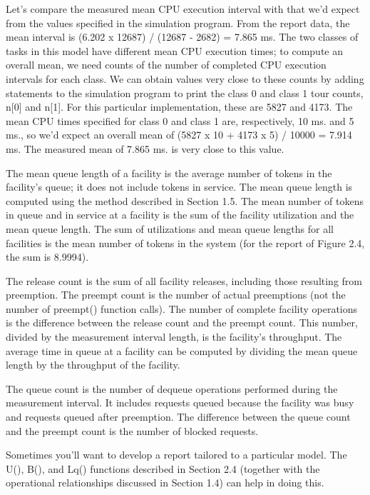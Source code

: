 Let's compare the measured mean CPU execution interval with that we'd expect
from the values specified in the simulation program. From the report data, the
mean interval is (6.202 x 12687) / (12687 - 2682) = 7.865 ms. The two classes
of tasks in this model have different mean CPU execution times; to compute an
overall mean, we need counts of the number of completed CPU execution
intervals for each class. We can obtain values very close to these counts by
adding statements to the simulation program to print the class 0 and class 1
tour counts, n[0] and n[1]. For this particular implementation, these are 5827
and 4173. The mean CPU times specified for class 0 and class 1 are,
respectively, 10 ms. and 5 ms., so we'd expect an overall mean of
(5827 x 10 + 4173 x 5) / 10000 = 7.914 ms. The measured mean of 7.865 ms. is
very close to this value.

The mean queue length of a facility is the average number of tokens in the
facility's queue; it does not include tokens in service. The mean queue length
is computed using the method described in Section 1.5. The mean number of
tokens in queue and in service at a facility is the sum of the facility
utilization and the mean queue length. The sum of utilizations and mean queue
lengths for all facilities is the mean number of tokens in the system (for the
report of Figure 2.4, the sum is 8.9994).

The release count is the sum of all facility releases, including those
resulting from preemption. The preempt count is the number of actual
preemptions (not the number of preempt() function calls). The number of
complete facility operations is the difference between the release count and
the preempt count. This number, divided by the measurement interval length,
is the facility's throughput. The average time in queue at a facility can be
computed by dividing the mean queue length by the throughput of the facility.

The queue count is the number of dequeue operations performed during the
measurement interval. It includes requests queued because the facility was
busy and requests queued after preemption. The difference between the queue
count and the preempt count is the number of blocked requests.

Sometimes you'll want to develop a report tailored to a particular model. The
U(), B(), and Lq() functions described in Section 2.4 (together with the
operational relationships discussed in Section 1.4) can help in doing this.

